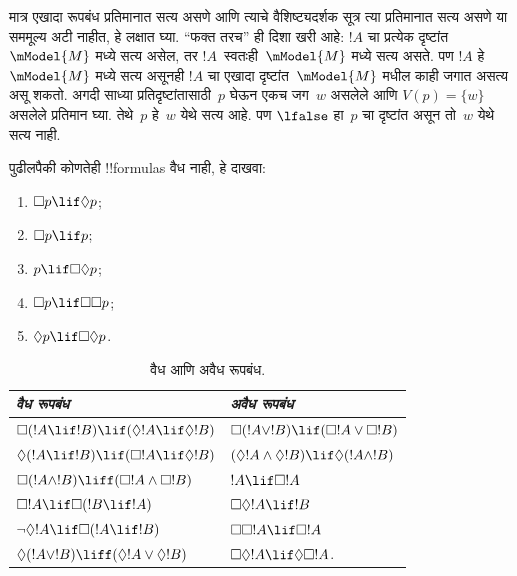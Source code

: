 \documentclass[../../../include/open-logic-section]{subfiles}
\begin{document}
मात्र एखादा रूपबंध प्रतिमानात सत्य असणे आणि त्याचे
वैशिष्ट्यदर्शक सूत्र त्या प्रतिमानात सत्य असणे या सममूल्य
अटी नाहीत, हे लक्षात घ्या. ``फक्त तरच'' ही दिशा खरी आहे:
$!A$ चा प्रत्येक दृष्टांत~$\mModel{M}$ मध्ये सत्य असेल,
तर $!A$~स्वतःही~$\mModel{M}$ मध्ये सत्य असते. पण
$!A$ हे~$\mModel{M}$ मध्ये सत्य असूनही $!A$ चा एखादा
दृष्टांत~$\mModel{M}$ मधील काही जगात असत्य असू शकतो.
अगदी साध्या प्रतिदृष्टांतासाठी~$p$ घेऊन एकच जग~$w$ असलेले आणि
$V(p) = \{w\}$ असलेले प्रतिमान घ्या. तेथे~$p$ हे~$w$
येथे सत्य आहे. पण $\lfalse$ हा~$p$ चा दृष्टांत असून
तो~$w$ येथे सत्य नाही.

\begin{prob}
  पुढीलपैकी कोणतेही !!{formula}s वैध नाही, हे दाखवा:
  \begin{enumerate}
    \item[\Ax{D}:] \quad $\Box p \lif \Diamond p$;
    \item[\Ax{T}:] \quad $\Box p \lif p$;
    \item[\Ax{B}:] \quad $p \lif \Box\Diamond p$;
    \item[\Ax{4}:] \quad $\Box p \lif \Box \Box p$;
    \item[\Ax{5}:] \quad $\Diamond p \lif \Box \Diamond
      p$.
  \end{enumerate}
\end{prob}

\begin{table}[t]
    \centering
    \begin{tabular}{| l || l |}
      \hline
      {\emph{वैध रूपबंध}} & {\emph{अवैध रूपबंध}} \\
      \hline\hline
      $\Box(!A \lif !B) \lif (\Diamond !A \lif \Diamond !B)$
      & $\Box (!A \lor !B) \lif (\Box !A \lor \Box !B)$ \\
      $\Diamond (!A \lif !B) \lif (\Box !A \lif \Diamond
      !B)$
      & $(\Diamond !A \land \Diamond !B) \lif \Diamond (!A
      \land !B)$\\
      $\Box (!A \land !B) \liff (\Box !A \land \Box !B)$
      & $!A \lif \Box !A$ \\
      $\Box !A \lif \Box (!B \lif !A)$
      & $\Box \Diamond !A \lif !B$ \\
      $\lnot \Diamond !A \lif \Box (!A \lif !B)$
      & $\Box \Box !A \lif \Box !A$ \\
      $\Diamond (!A \lor !B) \liff (\Diamond !A \lor
      \Diamond !B)$
      & $\Box \Diamond !A \lif \Diamond \Box !A$. \\
      \hline
    \end{tabular}
    \caption{वैध आणि अवैध रूपबंध.}
\end{table}
\end{document}
